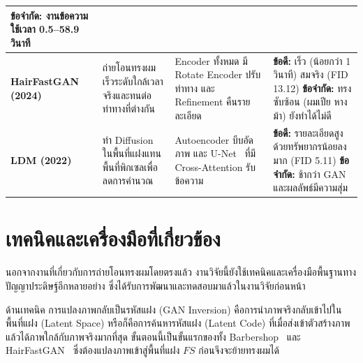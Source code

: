 \begin{table}[htbp]
\begin{tabular}{|L{2.1cm}|L{3.3cm}|L{4.1cm}|L{4.6cm}|}
  \newline \textbf{ข้อจำกัด:} งานข้อความใช้เวลา 0.5--58.9 วินาที \\
\hline
\textbf{HairFastGAN (2024)}~\cite{nikolaev2024hairfastganrealisticrobusthair}
& ถ่ายโอนทรงผมเร็วระดับใกล้เวลาจริงและทนต่อท่าทางที่ต่างกัน
& Encoder ทั้งหมด มี Rotate Encoder ปรับท่าทาง และ Refinement คืนรายละเอียด
& \textbf{ข้อดี:} เร็ว (น้อยกว่า 1 วินาที) สมจริง (FID 13.12)
  \newline \textbf{ข้อจำกัด:} ทรงซับซ้อน (ผมเปีย หางม้า) ยังทำได้ไม่ดี \\
\hline
\textbf{LDM (2022)}~\cite{rombach2022highresolutionimagesynthesislatent}
& ทำ Diffusion ในพื้นที่แฝงแทนพื้นที่พิกเซลเพื่อลดการคำนวณ
& Autoencoder บีบอัดภาพ และ U-Net~\cite{ronneberger2015unetconvolutionalnetworksbiomedical} ที่มี Cross-Attention รับข้อความ
& \textbf{ข้อดี:} รายละเอียดสูงด้วยทรัพยากรน้อยลงมาก (FID 5.11)
  \newline \textbf{ข้อจำกัด:} ช้ากว่า GAN และผลลัพธ์มีความสุ่ม \\
\hline
\end{tabular}
\par\vspace{3pt}{\footnotesize\raggedright หมายเหตุ: StyleGAN2 = Style-based Generative Adversarial Network รุ่นที่ 2, FID = Fréchet Inception Distance, FFHQ = Flickr-Faces-HQ, GAN = Generative Adversarial Network, II2S = Improved Image2StyleGAN, CLIP = Contrastive Language-Image Pre-training, PSNR = Peak Signal-to-Noise Ratio, LDM = Latent Diffusion Model\par}

\end{table}

\section{เทคนิคและเครื่องมือที่เกี่ยวข้อง}

นอกจากงานที่เกี่ยวกับการถ่ายโอนทรงผมโดยตรงแล้ว งานวิจัยนี้ยังใช้เทคนิคและเครื่องมือพื้นฐานทางปัญญาประดิษฐ์อีกหลายอย่าง
ซึ่งได้รับการพัฒนาและทดสอบมาแล้วในงานวิจัยก่อนหน้า

ด้านเทคนิค การแปลงภาพกลับเป็นรหัสแฝง (GAN Inversion) คือการนำภาพจริงกลับเข้าไปในพื้นที่แฝง (Latent Space)
หรือก็คือการค้นหารหัสแฝง (Latent Code) ที่เมื่อส่งเข้าตัวสร้างภาพแล้วได้ภาพใกล้กับภาพจริงมากที่สุด
ขั้นตอนนี้เป็นขั้นแรกของทั้ง Barbershop~\cite{Zhu_2021}
และ HairFastGAN~\cite{nikolaev2024hairfastganrealisticrobusthair}
ซึ่งต้องแปลงภาพเข้าสู่พื้นที่แฝง $FS$ ก่อนจึงจะย้ายทรงผมได้

